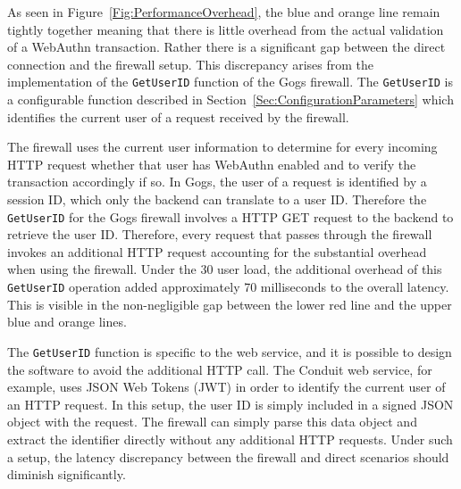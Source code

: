 As seen in Figure~\ref{Fig:PerformanceOverhead}, the blue and orange line remain tightly together meaning that there is little overhead from the actual validation of a WebAuthn transaction. Rather there is a significant gap between the direct connection and the firewall setup. This discrepancy arises from the implementation of the \lstinline{GetUserID} function of the Gogs firewall. The \lstinline{GetUserID} is a configurable function described in Section~\ref{Sec:ConfigurationParameters} which identifies the current user of a request received by the firewall. 

The firewall uses the current user information to determine for every incoming HTTP request whether that user has WebAuthn enabled and to verify the transaction accordingly if so. In Gogs, the user of a request is identified by a session ID, which only the backend can translate to a user ID. Therefore the \lstinline{GetUserID} for the Gogs firewall involves a HTTP GET request to the backend to retrieve the user ID. Therefore, every request that passes through the firewall invokes an additional HTTP request accounting for the substantial overhead when using the firewall. Under the 30 user load, the additional overhead of this \lstinline{GetUserID} operation added approximately 70 milliseconds to the overall latency. This is visible in the non-negligible gap between the lower red line and the upper blue and orange lines.

The \lstinline{GetUserID} function is specific to the web service, and it is possible to design the software to avoid the additional HTTP call. The Conduit web service, for example, uses JSON Web Tokens (JWT) in order to identify the current user of an HTTP request. In this setup, the user ID is simply included in a signed JSON object with the request. The firewall can simply parse this data object and extract the identifier directly without any additional HTTP requests. Under such a setup, the latency discrepancy between the firewall and direct scenarios should diminish significantly.




